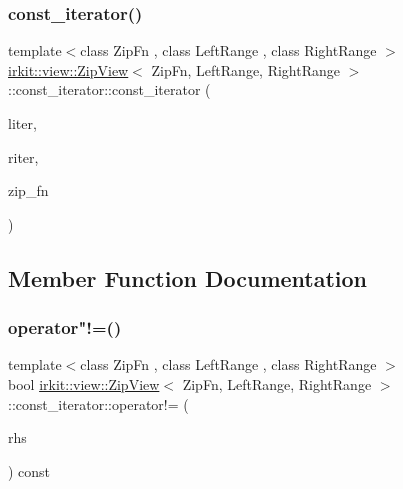 \subsubsection{\texorpdfstring{const\+\_\+iterator()}{const\_iterator()}}
{\footnotesize\ttfamily template$<$class Zip\+Fn , class Left\+Range , class Right\+Range $>$ \\
\mbox{\hyperlink{classirkit_1_1view_1_1ZipView}{irkit\+::view\+::\+Zip\+View}}$<$ Zip\+Fn, Left\+Range, Right\+Range $>$\+::const\+\_\+iterator\+::const\+\_\+iterator (\begin{DoxyParamCaption}\item[{\mbox{\hyperlink{namespaceirkit_a4b1668583041117eb42c1b5a1091b804}{const\+\_\+iterator\+\_\+t}}$<$ Left\+Range $>$}]{liter,  }\item[{\mbox{\hyperlink{namespaceirkit_a4b1668583041117eb42c1b5a1091b804}{const\+\_\+iterator\+\_\+t}}$<$ Right\+Range $>$}]{riter,  }\item[{Zip\+Fn}]{zip\+\_\+fn }\end{DoxyParamCaption})\hspace{0.3cm}{\ttfamily [inline]}}



\subsection{Member Function Documentation}
\mbox{\label{classirkit_1_1view_1_1ZipView_1_1const__iterator_a64c38c56be6d9bbe7486b97f651c38d4}} 
\subsubsection{\texorpdfstring{operator"!=()}{operator!=()}}
{\footnotesize\ttfamily template$<$class Zip\+Fn , class Left\+Range , class Right\+Range $>$ \\
bool \mbox{\hyperlink{classirkit_1_1view_1_1ZipView}{irkit\+::view\+::\+Zip\+View}}$<$ Zip\+Fn, Left\+Range, Right\+Range $>$\+::const\+\_\+iterator\+::operator!= (\begin{DoxyParamCaption}\item[{const \mbox{\hyperlink{classirkit_1_1view_1_1ZipView_1_1const__iterator}{const\+\_\+iterator}} \&}]{rhs }\end{DoxyParamCaption}) const\hspace{0.3cm}{\ttfamily [inline]}}


